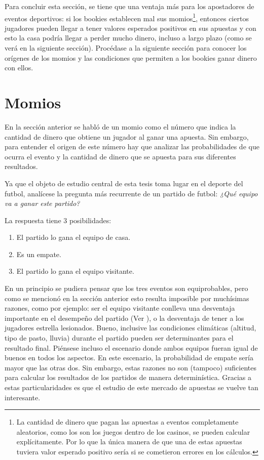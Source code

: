 Para concluir esta sección, se tiene que una ventaja más para los apostadores de eventos deportivos: si los bookies establecen mal sus momios\footnote{La cantidad de dinero que pagan las apuestas a eventos completamente aleatorios, como los son los juegos dentro de los casinos, se pueden calcular explícitamente. Por lo que la única manera de que una de estas apuestas tuviera valor esperado positivo sería si se cometieron errores en los cálculos.}, entonces ciertos jugadores pueden llegar a tener valores esperados positivos en sus apuestas y con esto la casa podría llegar a perder mucho dinero, incluso a largo plazo (como se verá en la siguiente sección). Procédase a la siguiente sección para conocer los orígenes de los momios y las condiciones que permiten a los bookies ganar dinero con ellos.


 \section{Momios}

En la sección anterior se habló de un momio como el número que indica la cantidad de dinero que obtiene un jugador al ganar una apuesta. Sin embargo, para entender el origen de este número hay que analizar las probabilidades de que ocurra el evento y la cantidad de dinero que se apuesta para sus diferentes resultados.
 
Ya que el objeto de estudio central de esta tesis toma lugar en el deporte del futbol, analícese la pregunta más recurrente de un partido de futbol: \emph{¿Qué equipo va a ganar este partido?}

La respuesta tiene $3$ posibilidades:
\begin{enumerate}
	\item El partido lo gana el equipo de casa.
	\item Es un empate.
	\item El partido lo gana el equipo visitante.
\end{enumerate}
En un principio se pudiera pensar que los tres eventos son equiprobables, pero como se mencionó en la sección anterior esto resulta imposible por muchísimas razones, como por ejemplo: ser el equipo visitante conlleva una desventaja importante en el desempeño del partido (Ver \cite{roffe2007crisis}), o la desventaja de tener a los jugadores estrella lesionados. Bueno, inclusive las condiciones climáticas (altitud, tipo de pasto, lluvia) durante el partido pueden ser determinantes para el resultado final. Piénsese incluso el escenario donde ambos equipos fueran igual de buenos en todos los aspectos. En este escenario, la probabilidad de empate sería mayor que las otras dos. Sin embargo, estas razones no son (tampoco) suficientes para calcular los resultados de los partidos de manera determinística. Gracias a estas particularidades es que el estudio de este mercado de apuestas se vuelve tan interesante.

